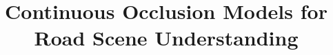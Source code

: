 \documentclass[10pt,twocolumn,letterpaper]{article}
\begin{document}
\title{Continuous Occlusion Models for Road Scene Understanding}


\maketitle



%
%
%
%

%

%







{\small


}
\end{document}

